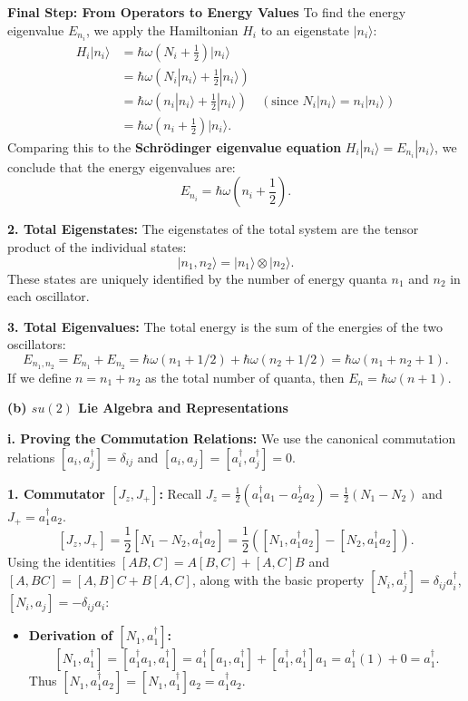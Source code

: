 \begin{solution}
\textbf{Final Step: From Operators to Energy Values}
To find the energy eigenvalue $E_{n_i}$, we apply the Hamiltonian $H_i$ to an eigenstate $|n_i\rangle$:
\[ \begin{aligned}
H_i |n_i\rangle &= \hbar\omega \left( N_i + \frac{1}{2} \right) |n_i\rangle \\
&= \hbar\omega \left( N_i |n_i\rangle + \frac{1}{2} |n_i\rangle \right) \\
&= \hbar\omega \left( n_i |n_i\rangle + \frac{1}{2} |n_i\rangle \right) \quad (\text{since } N_i |n_i\rangle = n_i |n_i\rangle) \\
&= \hbar\omega \left( n_i + \frac{1}{2} \right) |n_i\rangle.
\end{aligned} \]
Comparing this to the \textbf{Schrödinger eigenvalue equation} $H_i |n_i\rangle = E_{n_i} |n_i\rangle$, we conclude that the energy eigenvalues are:
\[ E_{n_i} = \hbar\omega \left( n_i + \frac{1}{2} \right). \]

\textbf{2. Total Eigenstates:}
The eigenstates of the total system are the tensor product of the individual states:
\[ |n_1, n_2\rangle = |n_1\rangle \otimes |n_2\rangle. \]
These states are uniquely identified by the number of energy quanta $n_1$ and $n_2$ in each oscillator.

\textbf{3. Total Eigenvalues:}
The total energy is the sum of the energies of the two oscillators:
\[ E_{n_1, n_2} = E_{n_1} + E_{n_2} = \hbar\omega(n_1 + 1/2) + \hbar\omega(n_2 + 1/2) = \hbar\omega(n_1 + n_2 + 1). \]
If we define $n = n_1 + n_2$ as the total number of quanta, then $E_n = \hbar\omega(n+1)$.

\textbf{(b) $su(2)$ Lie Algebra and Representations}

\textbf{i. Proving the Commutation Relations:}
We use the canonical commutation relations $[a_i, a_j^\dagger] = \delta_{ij}$ and $[a_i, a_j] = [a_i^\dagger, a_j^\dagger] = 0$.

\textbf{1. Commutator $[J_z, J_+]$:}
Recall $J_z = \frac{1}{2}(a_1^\dagger a_1 - a_2^\dagger a_2) = \frac{1}{2}(N_1 - N_2)$ and $J_+ = a_1^\dagger a_2$.
\[ [J_z, J_+] = \frac{1}{2} [N_1 - N_2, a_1^\dagger a_2] = \frac{1}{2} \left( [N_1, a_1^\dagger a_2] - [N_2, a_1^\dagger a_2] \right). \]
Using the identities $[AB, C] = A[B, C] + [A, C]B$ and $[A, BC] = [A, B]C + B[A, C]$, along with the basic property $[N_i, a_j^\dagger] = \delta_{ij} a_i^\dagger$, $[N_i, a_j] = -\delta_{ij} a_i$:
\begin{itemize}
    \item \textbf{Derivation of $[N_1, a_1^\dagger]$:}
    \[ [N_1, a_1^\dagger] = [a_1^\dagger a_1, a_1^\dagger] = a_1^\dagger [a_1, a_1^\dagger] + [a_1^\dagger, a_1^\dagger] a_1 = a_1^\dagger(1) + 0 = a_1^\dagger. \]
    Thus $[N_1, a_1^\dagger a_2] = [N_1, a_1^\dagger] a_2 = a_1^\dagger a_2$.
    

\end{itemize}
\end{solution}
